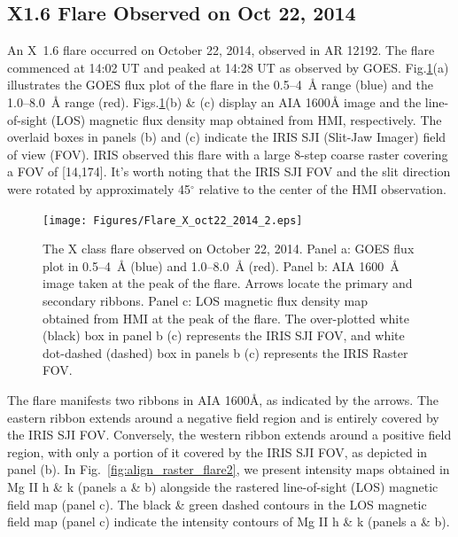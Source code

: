 \subsection{X1.6 Flare Observed on Oct 22, 2014}

An X~1.6 flare occurred on October 22, 2014, observed in AR 12192. The flare commenced at 14:02 UT and peaked at 14:28 UT as observed by GOES. Fig.\ref{flare2}(a) illustrates the GOES flux plot of the flare in the 0.5{--}4~{\AA} range (blue) and the 1.0{--}8.0~{\AA} range (red). Figs.\ref{flare2}(b) \& (c) display an AIA 1600{\AA} image and the line-of-sight (LOS) magnetic flux density map obtained from HMI, respectively. The overlaid boxes in panels (b) and (c) indicate the IRIS SJI (Slit-Jaw Imager) field of view (FOV). IRIS observed this flare with a large 8-step coarse raster covering a FOV of [14\arcsec,174\arcsec]. It's worth noting that the IRIS SJI FOV and the slit direction were rotated by approximately 45$^\circ$ relative to the center of the HMI observation.

\begin{figure}[ht!]
    \centering
\hspace*{-.5in}
\texttt{[image: Figures/Flare\_X\_oct22\_2014\_2.eps]}
\caption{The X class flare observed on October 22, 2014. Panel a: GOES flux plot in 0.5{--}4~{\AA} (blue) and 1.0{--}8.0~{\AA} (red). Panel b: AIA 1600~{\AA} image taken at the peak of the flare. Arrows locate the primary and secondary ribbons. Panel c: LOS magnetic flux density map obtained from HMI at the peak of the flare. The over-plotted white (black) box in panel b (c) represents the IRIS SJI FOV, and white dot-dashed (dashed) box in panels b (c) represents the IRIS Raster FOV.}\label{flare2}
\end{figure}

The flare manifests two ribbons in AIA 1600{\AA}, as indicated by the arrows. The eastern ribbon extends around a negative field region and is entirely covered by the IRIS SJI FOV. Conversely, the western ribbon extends around a positive field region, with only a portion of it covered by the IRIS SJI FOV, as depicted in panel (b). In Fig.~\ref{fig:align_raster_flare2}, we present intensity maps obtained in Mg II h \& k (panels a \& b) alongside the rastered line-of-sight (LOS) magnetic field map (panel c). The black \& green dashed contours in the LOS magnetic field map (panel c) indicate the intensity contours of Mg II h \& k (panels a \& b).


